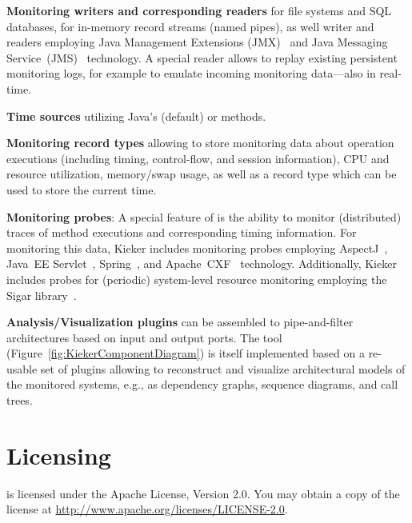 \begin{compactitem}
 \item \textbf{Monitoring writers and corresponding readers} for %
file systems and SQL databases, %
for in-memory record streams (named pipes), %
as well writer and readers employing Java Management %
Extensions (JMX)~\cite{JMX-Website} and %
Java Messaging Service~(JMS)~\cite{JMS-WebSite} technology. %
A special reader allows to replay existing persistent %
monitoring logs, for example to emulate incoming monitoring %
data---also in real-time.
 \item \textbf{Time sources} utilizing Java's  (default) %
or  methods.
 \item \textbf{Monitoring record types} allowing to store %
monitoring data about operation executions (including timing, control-flow, %
and session information), CPU and resource utilization, memory/swap usage, as well as %
a record type which can be used to store the current time.
\item \textbf{Monitoring probes}: A special feature of \Kieker{} is the ability to monitor (distributed) %
traces of method executions and corresponding timing information. %
For monitoring this data, Kieker includes monitoring probes employing %
AspectJ~\cite{AspectJ-WebSite}, %
Java~EE Servlet~\cite{JavaServletTechnology-WebSite}, %
Spring~\cite{Spring-WebSite}, and %
Apache~CXF~\cite{CXF-WebSite} technology. %
Additionally, Kieker includes probes for (periodic) system-level resource %
monitoring employing the Sigar library~\cite{HypericSigarWebsite}.
\item \textbf{Analysis/Visualization plugins} can be assembled to %
pipe-and-filter architectures based on input and output ports. The %
\KiekerTraceAnalysis{} tool (Figure~\ref{fig:KiekerComponentDiagram}) %
is itself implemented based on a re-usable set of \KiekerAnalysisPart{} %
plugins allowing to reconstruct and visualize architectural models of the %
monitored systems, e.g., as dependency graphs, sequence diagrams, and call %
trees. %
\end{compactitem}




\section{Licensing}

\Kieker{} is licensed under the Apache License, Version 2.0. You may obtain a copy of %
the license at \url{http://www.apache.org/licenses/LICENSE-2.0}.

